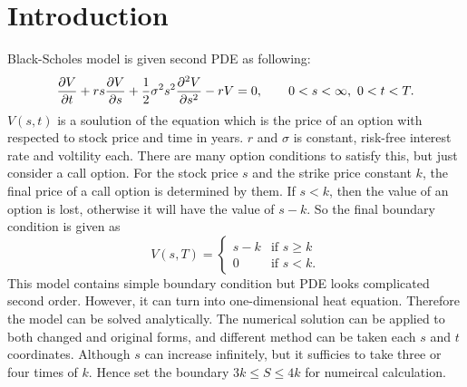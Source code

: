 \section{Introduction}
	Black-Scholes model is given second PDE as following:
	\begin{equation*}
		\frac{\partial V}{\partial t}+rs\frac{\partial V}{\partial s} + \frac{1}{2}\sigma^2s^2\frac{\partial^{2}V}{\partial s^{2}}-rV=0, \qquad 0 < s < \infty,\ 0 < t < T.
	\end{equation*}
	$V(s,t)$ is a soulution of the equation which is the price of an option with respected to stock price and time in years. $r$ and $\sigma$ is constant, risk-free interest rate and voltility each. There are many option conditions to satisfy this, but just consider a call option. For the stock price $s$ and the strike price constant $k$, the final price of a call option is determined by them. If $s<k$, then the value of an option is lost, otherwise it will have the value of $s-k$. So the final boundary condition is given as
	\begin{equation*}
		V(s,T) =
		\begin{cases}
			s-k & \mbox{if } s \ge k \\
			0 & \mbox{if } s < k.
		\end{cases}
	\end{equation*}
	This model contains simple boundary condition but PDE looks complicated second order. However, it can turn into one-dimensional heat equation. Therefore the model can be solved analytically. The numerical solution can be applied to both changed and original forms, and different method can be taken each $s$ and $t$ coordinates. Although $s$ can increase infinitely, but it sufficies to take three or four times of $k$. Hence set the boundary $3k \leq S \leq 4k$ for numeircal calculation.